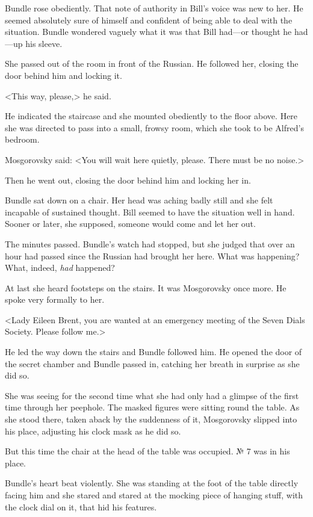 Bundle rose obediently. That note of authority in Bill's voice was new to her. He seemed absolutely sure of himself and confident of being able to deal with the situation. Bundle wondered vaguely what it was that Bill had—or thought he had—up his sleeve.

She passed out of the room in front of the Russian. He followed her, closing the door behind him and locking it.

<This way, please,> he said.

He indicated the staircase and she mounted obediently to the floor above. Here she was directed to pass into a small, frowsy room, which she took to be Alfred's bedroom.

Mosgorovsky said: <You will wait here quietly, please. There must be no noise.>

Then he went out, closing the door behind him and locking her in.

Bundle sat down on a chair. Her head was aching badly still and she felt incapable of sustained thought. Bill seemed to have the situation well in hand. Sooner or later, she supposed, someone would come and let her out.

The minutes passed. Bundle's watch had stopped, but she judged that over an hour had passed since the Russian had brought her here. What was happening? What, indeed, \emph{had} happened?

At last she heard footsteps on the stairs. It was Mosgorovsky once more. He spoke very formally to her.

<Lady Eileen Brent, you are wanted at an emergency meeting of the Seven Dials Society. Please follow me.>

He led the way down the stairs and Bundle followed him. He opened the door of the secret chamber and Bundle passed in, catching her breath in surprise as she did so.

She was seeing for the second time what she had only had a glimpse of the first time through her peephole. The masked figures were sitting round the table. As she stood there, taken aback by the suddenness of it, Mosgorovsky slipped into his place, adjusting his clock mask as he did so.

But this time the chair at the head of the table was occupied. № 7 was in his place.

Bundle's heart beat violently. She was standing at the foot of the table directly facing him and she stared and stared at the mocking piece of hanging stuff, with the clock dial on it, that hid his features.

